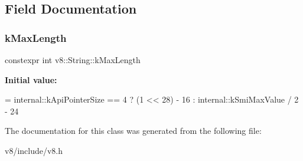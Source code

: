 \subsection{Field Documentation}
\mbox{\label{classv8_1_1String_a66259940a4836974906729017ff25fd2}} 
\subsubsection{\texorpdfstring{k\+Max\+Length}{kMaxLength}}
{\footnotesize\ttfamily constexpr int v8\+::\+String\+::k\+Max\+Length\hspace{0.3cm}{\ttfamily [static]}}

{\bfseries Initial value\+:}
\begin{DoxyCode}
= internal::kApiPointerSize == 4
                                        ? (1 << 28) - 16
                                        : internal::kSmiMaxValue / 2 - 24
\end{DoxyCode}


The documentation for this class was generated from the following file\+:\begin{DoxyCompactItemize}
\item 
v8/include/v8.\+h\end{DoxyCompactItemize}
